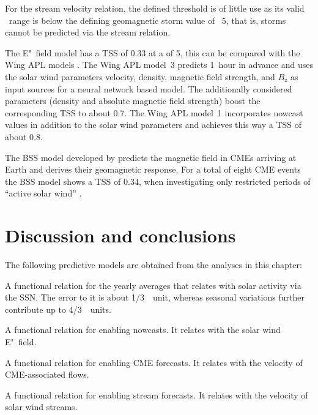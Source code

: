 For the stream velocity relation, the defined \Kp{} threshold is of little use as its valid \Kp~range is below the defining geomagnetic storm value of \Kp{}~5, that is, storms cannot be predicted via the stream relation.

The E"~field model has a TSS of 0.33 at a \Kp{} of 5, this can be compared with the Wing APL models \citep[Fig.~13]{Wing2005}. The Wing APL model~3 predicts \Kp{} 1~hour in advance and uses the solar wind parameters velocity, density, magnetic field strength, and $B_\text{z}$ as input sources for a neural network based model. The additionally considered parameters (density and absolute magnetic field strength) boost the corresponding TSS to about 0.7. The Wing APL model~1 incorporates \Kp{} nowcast values in addition to the solar wind parameters and achieves this way a TSS of about 0.8.

The BSS model developed by \citet{Savani2015,Savani2017} predicts the magnetic field in CMEs arriving at Earth and derives their geomagnetic response. For a total of eight CME events the BSS model shows a TSS of 0.34, when investigating only restricted periods of ``active solar wind'' \citep[Tab.~3]{Savani2017}.



\section{Discussion and conclusions}
The following predictive models are obtained from the \Kp{} analyses in this chapter:
\begin{itemize*}
	\item A functional relation for the yearly \Kp{} averages that relates \Kp{} with solar activity via the SSN. The error to it is about 1/3~\Kp{}~unit, whereas seasonal variations further contribute up to 4/3~\Kp{}~units.
	\item A functional relation for enabling \Kp{} nowcasts. It relates \Kp{} with the solar wind E"~field.
	\item A functional relation for enabling CME forecasts. It relates \Kp{} with the velocity of CME-associated flows.
	\item A functional relation for enabling stream forecasts. It relates \Kp{} with the velocity of solar wind streams.
\end{itemize*}

